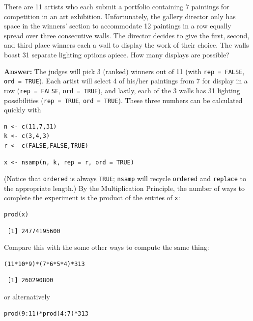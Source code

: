 \documentclass[captions=tableheading]{scrbook}
\begin{document}
\begin{example}
There are 11 artists who each submit a portfolio containing 7 paintings for competition in an art exhibition. Unfortunately, the gallery director only has space in the winners' section to accommodate 12 paintings in a row equally spread over three consecutive walls. The director decides to give the first, second, and third place winners each a wall to display the work of their choice. The walls boast 31 separate lighting options apiece. How many displays are possible?

\textbf{Answer:} The judges will pick 3 (ranked) winners out of 11 (with \texttt{rep = FALSE}, \texttt{ord = TRUE}). Each artist will select 4 of his/her paintings from 7 for display in a row (\texttt{rep = FALSE}, \texttt{ord = TRUE}), and lastly, each of the 3 walls has 31 lighting possibilities (\texttt{rep = TRUE}, \texttt{ord = TRUE}). These three numbers can be calculated quickly with 


\begin{verbatim}
n <- c(11,7,31) 
k <- c(3,4,3) 
r <- c(FALSE,FALSE,TRUE)
\end{verbatim}


\begin{verbatim}
x <- nsamp(n, k, rep = r, ord = TRUE)
\end{verbatim}

(Notice that \texttt{ordered} is always \texttt{TRUE}; \texttt{nsamp} will recycle \texttt{ordered} and \texttt{replace} to the appropriate length.) By the Multiplication Principle, the number of ways to complete the experiment is the product of the entries of \texttt{x}: 


\begin{verbatim}
prod(x)
\end{verbatim}

\begin{verbatim}
 [1] 24774195600
\end{verbatim}

Compare this with the some other ways to compute the same thing: 


\begin{verbatim}
(11*10*9)*(7*6*5*4)*313
\end{verbatim}

\begin{verbatim}
 [1] 260290800
\end{verbatim}

or alternatively 


\begin{verbatim}
prod(9:11)*prod(4:7)*313
\end{verbatim}


\end{example}
\end{document}
